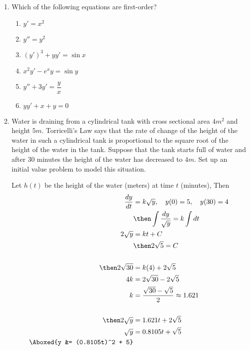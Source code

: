 \documentclass{nosvagor-notes}
\begin{document}
\begin{enumerate}
  \item Which of the following equations are first-order?
    \begin{multicols}{2}
      \begin{enumerate}
        \item \(y' = x^2 \) 
        \item \(y'' = y^2\) 
        \item \((y')^3 + yy' = \sin x\) 
        \item \(x^2y' - e^xy = \sin y\) 
        \item \(y'' + 3y' = \dfrac{y}{x}\) 
        \item \(yy' + x + y = 0\) 
      \end{enumerate}
    \end{multicols}

  \newpage

  \item Water is draining from a cylindrical tank with cross sectional area
  \(4m^2\) and height \(5m\). Torricelli’s  Law says that the rate of change of the
  height of the water in such a cylindrical tank is proportional to the square
  root of the height of the water in the tank. Suppose that the tank starts
  full of water and after 30 minutes the height of the water has decreased to
  \(4m\). Set up an initial value problem to model this situation.

  \vspace{30pt}
  Let \(h(t)\) be the height of the water (meters) at time \(t\) (minutes), Then
  \begin{align*}
    \frac{dy}{dt} &= k\sqrt{y}, \quad y(0) = 5, \quad y(30)= 4 \\
    &\then \int \frac{dy}{\sqrt{y} } = k\int dt \\
    2\sqrt{y} &= kt + C \\
    &\then 2\sqrt{5} = C \\\\
    \then 2\sqrt{30} &= k(4) + 2\sqrt{5} \\
    4k &= 2\sqrt{30}-2\sqrt{5} \\
    k &= \frac{\sqrt{30} - \sqrt{5}}{2} \approx 1.621 \\\\
    \then 2\sqrt{y} &= 1.621t + 2\sqrt{5} \\
       \sqrt{y} &= 0.8105t + \sqrt{5} \\
       \Aboxed{y &= (0.8105t)^2 + 5}
  \end{align*}


\end{enumerate}
\end{document}
